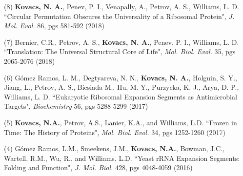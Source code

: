 

\begin{cvpublications}


\cvpublication
{(8) \textbf{Kovacs, N. A.}, Penev, P. I., Venapally, A., Petrov, A. S., Williams, L. D. ``Circular Permutation Obscures the Universality of a Ribosomal Protein", \textit{J. Mol. Evol.} 86, pgs 581-592 (2018)}
\vspace{-4.0mm}


\cvpublication
{(7) Bernier, C.R., Petrov, A. S., \textbf{Kovacs, N. A.},  Penev, P. I., Williams, L. D. ``Translation: The Universal Structural Core of Life", \textit{Mol. Biol. Evol.} 35, pgs 2065-2076 (2018)}
\vspace{-4.0mm}


\cvpublication
{(6) G{\'o}mez Ramos, L. M., Degtyareva, N. N., \textbf{Kovacs, N. A.}, Holguin, S. Y., Jiang, L., Petrov, A. S., Biesiada M., Hu, M. Y., Purzycka, K. J., Arya, D. P., Williams, L. D. ``Eukaryotic Ribosomal Expansion Segments as Antimicrobial Targets", \textit{Biochemistry} 56, pgs 5288-5299 (2017)}
\vspace{-4.0mm}


\cvpublication
{(5) \textbf{Kovacs, N.A.}, Petrov, A.S., Lanier, K.A., and Williams, L.D. ``Frozen in Time: The History of Proteins", \textit{Mol. Biol. Evol.} 34, pgs 1252-1260 (2017)}
\vspace{-4.0mm}


\cvpublication
{(4) G{\'o}mez Ramos, L.M., Smeekens, J.M., \textbf{Kovacs, N.A.}, Bowman, J.C., Wartell, R.M., Wu, R., and Williams, L.D. ``Yeast rRNA Expansion Segments: Folding and Function", \textit{J. Mol. Biol.} 428, pgs 4048-4059 (2016)}
\vspace{-4.0mm}


\end{cvpublications}
